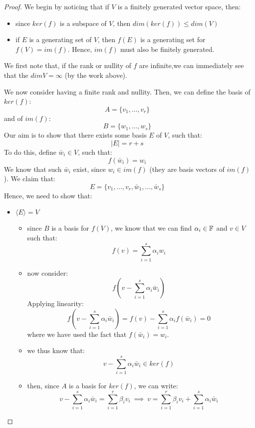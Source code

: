 \documentclass{exam}
\begin{document}
\begin{proof}

We begin by noticing that if $V$ is a finitely generated vector space, then:
\begin{itemize}
    \item since $ker(f)$ is a subspace of $V$, then $dim(ker(f)) \leq dim(V)$
    \item if $E$ is a generating set of $V$, then $f(E)$ is a generating set for $f(V) = im(f)$. Hence, $im(f)$ must also be finitely generated.
\end{itemize}

We first note that, if the rank or nullity of $f$ are infinite,we can immediately see that the $dim V = \infty$ (by the work above).

\bigskip

We now consider having a finite rank and nullity. Then, we can define the basis of $ker(f)$:
\[
A = \{v_1, \ldots, v_r\}
\]
and of $im(f)$:
\[
B = \{w_1, \ldots, w_s\}
\]
Our aim is to show that there exists some basis $E$ of $V$, such that:
\[
|E| = r + s
\]
To do this, define $\bar{w}_i \in V$, such that:
\[
f(\bar{w}_i) = w_i
\]
We know that such $\bar{w}_i$ exist, since $w_i \in im(f)$ (they are basis vectors of $im(f)$). We claim that:
\[
E = \{v_1, \ldots, v_r, \bar{w}_1, \ldots, \bar{w}_s\}
\]
Hence, we need to show that:
\begin{itemize}
    \item $\langle E \rangle = V$
    \begin{itemize}
        \item since $B$ is a basis for $f(V)$, we know that we can find $\alpha_i \in \mathbb{F}$ and $v \in V$ such that:
        \[
        f(v) = \sum_{i = 1}^s \alpha_i w_i
        \]
        \item now consider:
        \[
        f\left(v - \sum_{i = 1}^s \alpha_i \bar{w}_i\right)
        \]
        Applying linearity:
        \[
        f\left(v - \sum_{i = 1}^s \alpha_i \bar{w}_i\right) = f(v) - \sum_{i = 1}^s \alpha_i f(\bar{w}_i) = 0
        \]
        where we have used the fact that $f(\bar{w}_i) = w_i$.
        \item we thus know that:
        \[
        v - \sum_{i = 1}^s \alpha_i \bar{w}_i \in ker(f)
        \]
        \item then, since $A$ is a basis for $ker(f)$, we can write:
        \[
        v - \sum_{i = 1}^s \alpha_i \bar{w}_i = \sum_{i = 1}^r \beta_i v_i \ \implies \ v = \sum_{i = 1}^r \beta_i v_i + \sum_{i = 1}^s \alpha_i \bar{w}_i
        \]

\end{itemize}
\end{itemize}
\end{proof}
\end{document}
